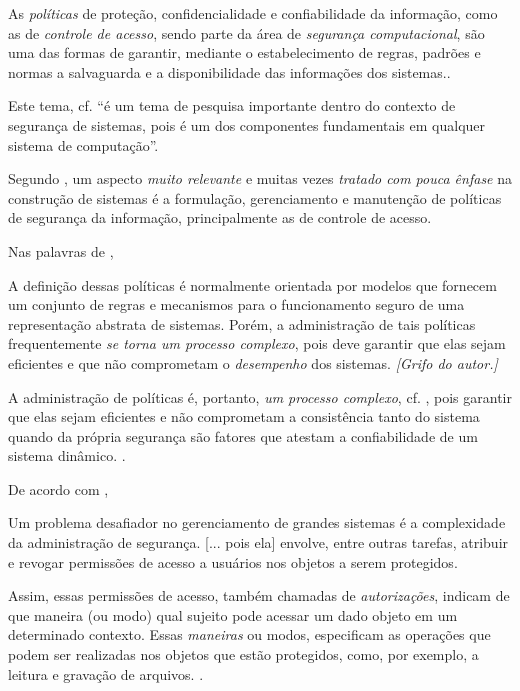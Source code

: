 \documentclass[
	12pt,				%
	openright,			%
	oneside,			%
	a4paper,			%
	english,			%
	french,				%
	spanish,			%
	brazil				%
	]{abntex2}
\begin{document}
As \textit{políticas} de proteção, confidencialidade e confiabilidade da informação, como as de \textit{controle de acesso}, sendo parte da área de \textit{segurança computacional}, são uma das formas de garantir, mediante o estabelecimento de regras, padrões e normas a salvaguarda e a disponibilidade das informações dos sistemas.\cite{sarkis2017}\cite{bui_efficient_2019}. 

Este tema, cf.  ``é um tema de pesquisa importante dentro do contexto de segurança de sistemas, pois é um dos componentes fundamentais em qualquer sistema de computação''.

Segundo , um aspecto \textit{muito relevante} e muitas vezes \textit{tratado com pouca ênfase} na construção de sistemas é a formulação, gerenciamento e manutenção de políticas de segurança da informação, principalmente as de controle de acesso. 

Nas palavras de ,
\begin{citacao}
	A definição dessas políticas é normalmente orientada por modelos que fornecem um conjunto de regras e mecanismos para o funcionamento seguro de uma representação abstrata de sistemas. Porém, a administração de tais políticas frequentemente \textit{se torna um processo complexo}, pois deve garantir que elas sejam eficientes e que não comprometam o \textit{desempenho} dos sistemas. \emph{[Grifo do autor.]}
\end{citacao}

A administração de políticas é, portanto, \textit{um processo complexo}, cf. , pois garantir que elas sejam eficientes e não comprometam a consistência tanto do sistema quando da própria segurança são fatores que atestam a confiabilidade de um sistema dinâmico. .

De acordo com , 
\begin{citacao}
	Um problema desafiador no gerenciamento de grandes sistemas é a complexidade da administração de segurança. [... pois ela] envolve, entre outras tarefas, atribuir e revogar permissões de acesso a usuários nos objetos a serem protegidos.
\end{citacao}

Assim, essas permissões de acesso, também chamadas de \textit{autorizações}, indicam de que maneira (ou modo) qual sujeito pode acessar um dado objeto em um determinado contexto. Essas \textit{maneiras} ou modos, especificam as operações que podem ser realizadas nos objetos que estão protegidos, como, por exemplo, a leitura e gravação de arquivos. \cite[p. 21]{bellettini_role_2001}.
	
\end{document}

